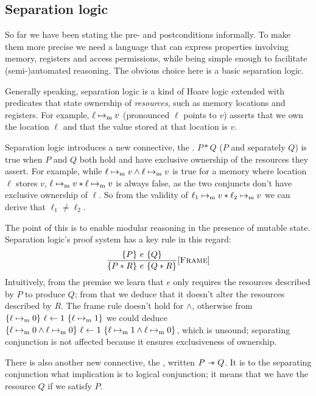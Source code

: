 \subsection{Separation logic}

So far we have been stating the pre- and postconditions informally. To make them more precise we need a language that can express properties involving memory, registers and access permissions, while being simple enough to facilitate (semi-)automated reasoning. The obvious choice here is a basic separation logic.

Generally speaking, separation logic is a kind of Hoare logic extended with predicates that state ownership of \emph{resources}, such as memory locations and registers. For example, \(\ell \mapsto_{\mathrm{m}} v\) (pronounced \(\ell\) points to \(v\)) asserts that we own the location \(\ell\) and that the value stored at that location is \(v\).

Separation logic introduces a new connective, the . \(P \ast Q\) (\(P\) and separately \(Q\)) is true when \(P\) and \(Q\) both hold and have exclusive ownership of the resources they assert. For example, while \(\ell \mapsto_{\mathrm{m}} v \wedge \ell \mapsto_{\mathrm{m}} v\) is true for a memory where location \(\ell\) stores \(v\), \(\ell \mapsto_{\mathrm{m}} v \ast \ell \mapsto_{\mathrm{m}} v\) is always false, as the two conjuncts don't have exclusive ownership of \(\ell\). So from the validity of \(\ell_1 \mapsto_{\mathrm{m}} v \ast \ell_2 \mapsto_{\mathrm{m}} v\) we can derive that \(\ell_1 \neq \ell_2\).

The point of this is to enable modular reasoning in the presence of mutable state. Separation logic's proof system has a key rule in this regard:
\[ \frac{\hoare{P}{e}{Q}}{\hoare{P \ast R}{e}{Q \ast R}}[\textsc{Frame}] \]
Intuitively, from the premise we learn that \(e\) only requires the resources described by \(P\) to produce \(Q\); from that we deduce that it doesn't alter the resources described by \(R\). The frame rule doesn't hold for \(\wedge\), otherwise from \(\hoare{\ell \ptom 0}{\ell \leftarrow 1}{\ell \ptom 1}\) we could deduce \(\hoare{\ell \ptom 0 \wedge \ell \ptom 0}{\ell \leftarrow 1}{\ell \ptom 1 \wedge \ell \ptom 0}\), which is unsound; separating conjunction is not affected because it ensures exclusiveness of ownership.

There is also another new connective, the , written \(P \mathrel{-\!\!\ast} Q\). It is to the separating conjunction what implication is to logical conjunction; it means that we have the resource \(Q\) if we satisfy \(P\).

